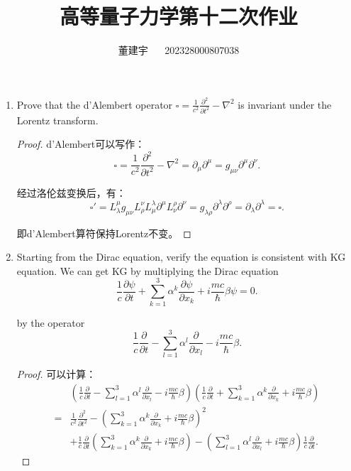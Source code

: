 \documentclass[reqno,a4paper,12pt]{amsart}
\title{高等量子力学第十二次作业}
\author{董建宇 ~~ 202328000807038}
\begin{document}
\maketitle

\begin{enumerate}[1.]

\item Prove that the d'Alembert operator $\square = \frac{1}{c^2}\frac{\partial^2}{\partial t^2} - \nabla^2$ is invariant under the Lorentz transform.

\begin{proof}
d'Alembert可以写作：
\[
	\square = \frac{1}{c^2}\frac{\partial^2}{\partial t^2} - \nabla^2 = \partial_\mu \partial^\mu = g_{\mu\nu} \partial^\mu \partial^\nu.
\]

经过洛伦兹变换后，有：
\[
	\square' = L_\lambda^\mu g_{\mu\nu} L_\rho^\nu L_\mu^\lambda \partial^\mu L_\nu^\rho \partial^\nu = g_{\lambda\rho} \partial^\lambda \partial^\rho = \partial_\lambda \partial^\lambda = \square.
\]

即d'Alembert算符保持Lorentz不变。

\end{proof}

\medskip

\item Starting from the Dirac equation, verify the equation is consistent with KG equation. We can get KG by multiplying the Dirac equation 
\[
	\frac{1}{c} \frac{\partial \psi}{\partial t} + \sum_{k=1}^3 \alpha^k \frac{\partial \psi}{\partial x_k} + i\frac{mc}{\hbar}\beta\psi = 0.
\]

by the operator
\[
	\frac{1}{c}\frac{\partial }{\partial t} - \sum_{l=1}^3 \alpha^l \frac{\partial }{\partial x_l} - i\frac{mc}{\hbar}\beta.
\]

\begin{proof}
可以计算：
\begin{align*}
	&\left( \frac{1}{c}\frac{\partial }{\partial t} - \sum_{l=1}^3 \alpha^l \frac{\partial }{\partial x_l} - i\frac{mc}{\hbar}\beta \right) \left( \frac{1}{c}\frac{\partial }{\partial t} + \sum_{k=1}^3 \alpha^k \frac{\partial }{\partial x_k} + i\frac{mc}{\hbar}\beta \right) \\
	=& \frac{1}{c^2} \frac{\partial^2}{\partial t^2} - \left( \sum_{k=1}^3 \alpha^k \frac{\partial }{\partial x_k} + i\frac{mc}{\hbar}\beta \right)^2 \\
	&+ \frac{1}{c}\frac{\partial}{\partial t} \left( \sum_{k=1}^3 \alpha^k \frac{\partial }{\partial x_k} + i\frac{mc}{\hbar}\beta \right) - \left( \sum_{l=1}^3 \alpha^l \frac{\partial }{\partial x_l} + i\frac{mc}{\hbar}\beta \right) \frac{1}{c} \frac{\partial}{\partial t}.
\end{align*}


\end{proof}
\end{enumerate}
\end{document}
